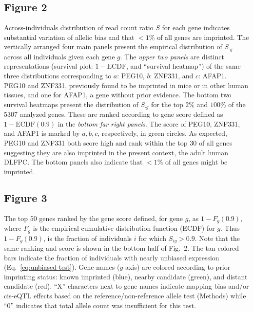 \documentclass[letterpaper]{article}
\begin{document}
\subsection*{Figure 2}

Across-individuals distribution of read count ratio \(S\) for each
gene indicates substantial variation of allelic bias and that \(<1\%\) of all
genes are imprinted.  The vertically arranged
four main panels present the empirical distribution of \(S_{\cdot g}\) across all
individuals given each gene \(g\).  The \emph{upper two panels} are distinct
representations (survival plot: \(1 - \mathrm{ECDF}\), and
``survival heatmap'') of the same three distributions corresponding to \(a\):
PEG10, \(b\): ZNF331, and \(c\): AFAP1.  PEG10 and ZNF331,
previously found to be imprinted in mice or in other human tissues, and one
for AFAP1, a gene without prior evidence.  The bottom two survival heatmaps present
the distribution of \(S_{\cdot g}\) for the top \(2\%\) and \(100\%\) of the
5307 analyzed genes.  These are ranked according to gene score defined as \(1
- \mathrm{ECDF}(0.9)\) in the \emph{bottom
far right panels}.  The score of PEG10, ZNF331, and AFAP1 is marked by
\(a,b,c\), respectively, in green circles.  As expected, PEG10 and ZNF331 both score
high and rank within the top 30 of all genes suggesting they are also imprinted in
the present context, the adult human DLFPC.  The bottom panels also indicate
that \(<1\%\) of all genes might be imprinted.

\subsection*{Figure 3}

The top 50 genes ranked by the gene score defined, for gene \(g\), as \(1 -
F_g(0.9)\), where \(F_g\) is the empirical cumulative distribution function
(ECDF) for \(g\).  Thus \(1 - F_g(0.9)\), is the fraction of individuals \(i\)
for which \(S_{ig}>0.9\).  Note that the same ranking and score is shown in
the bottom half of Fig.~2.  The tan colored bars
indicate the fraction of individuals with nearly unbiased expression
(Eq.~\ref{eq:unbiased-test}).  Gene names (\(y\) axis) are colored according
to prior imprinting status: known imprinted (blue), nearby candidate (green),
and distant candidate (red).  ``X'' characters next to gene names indicate
mapping bias and/or cis-eQTL effects based on the reference/non-reference
allele test (Methods) while ``0'' indicates that total allele count was
insufficient for this test.
\end{document}
